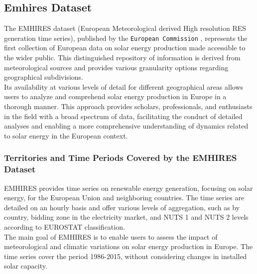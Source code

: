 \documentclass[12pt]{article}
\begin{document}
\subsection{Emhires Dataset}
The EMHIRES dataset (European Meteorological derived High resolution RES generation time series), published by the \texttt{European Commission} \cite{gonzalezaparicio2017jrc}, represents the first collection of European data on solar energy production made accessible to the wider public. This distinguished repository of information is derived from meteorological sources and provides various granularity options regarding geographical subdivisions.
\\
Its availability at various levels of detail for different geographical areas allows users to analyze and comprehend solar energy production in Europe in a thorough manner. This approach provides scholars, professionals, and enthusiasts in the field with a broad spectrum of data, facilitating the conduct of detailed analyses and enabling a more comprehensive understanding of dynamics related to solar energy in the European context.

\subsubsection{Territories and Time Periods Covered by the EMHIRES Dataset}
EMHIRES provides time series on renewable energy generation, focusing on solar energy, for the European Union and neighboring countries. 
The time series are detailed on an hourly basis and offer various levels of aggregation, such as by country, bidding zone in the electricity market, and NUTS 1 and NUTS 2 levels according to EUROSTAT classification.
\\
The main goal of EMHIRES is to enable users to assess the impact of meteorological and climatic variations on solar energy production in Europe. The time series cover the period 1986-2015, without considering changes in installed solar capacity.
\end{document}
